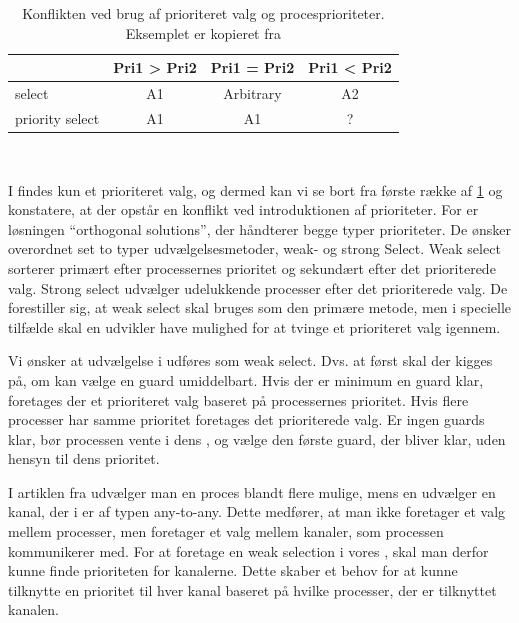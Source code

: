\begin{table}[htbp]
	\centering
	\begin{tabular}{lccc}
       	\toprule
        &Pri1 > Pri2 & Pri1 = Pri2 & Pri1 < Pri2\\
        \midrule
          	select          & A1 & Arbitrary    & A2 \\
		    priority select & A1 & A1           & ? \\    
        \bottomrule
        \end{tabular}
    \caption[]{Konflikten ved brug af prioriteret valg og procesprioriteter. Eksemplet er kopieret fra \cite[160]{Burns1990}}\\
    \label{tab:prioritizedSelect}
\end{table}

I \pycsp findes kun et prioriteret valg, og dermed kan vi se bort fra første række af \cref{tab:prioritizedSelect} og konstatere, at der opstår en konflikt ved introduktionen af prioriteter. For \citeauthor{Burns1990} er løsningen ``orthogonal solutions'', der håndterer begge typer prioriteter. De ønsker overordnet set to typer udvælgelsesmetoder, weak- og strong Select. Weak select sorterer primært efter processernes prioritet og sekundært efter det prioriterede valg. Strong select udvælger udelukkende processer efter det prioriterede valg. De forestiller sig, at weak select skal bruges som den primære metode, men i specielle tilfælde skal en udvikler have mulighed for at tvinge et prioriteret valg igennem.

Vi ønsker at udvælgelse i  udføres som weak select. Dvs. at først skal der kigges på, om  kan vælge en guard umiddelbart. Hvis der er minimum en guard klar, foretages der et prioriteret valg baseret på processernes prioritet. Hvis flere processer har samme prioritet foretages det prioriterede valg. Er ingen guards klar, bør processen vente i dens , og vælge den første guard, der bliver klar, uden hensyn til dens prioritet.

I artiklen fra \citeauthor{Burns1990} udvælger man en proces blandt flere mulige, mens en  udvælger en kanal, der i \pycsp er af typen any-to-any. Dette medfører, at man ikke  foretager et valg mellem processer, men foretager et valg mellem kanaler, som processen kommunikerer med. For at foretage en weak selection i vores , skal man derfor kunne finde prioriteten for kanalerne. Dette skaber et behov for at kunne tilknytte en prioritet til hver kanal baseret på hvilke processer, der er tilknyttet kanalen. 
\label{misc:kanal-prioritet}



